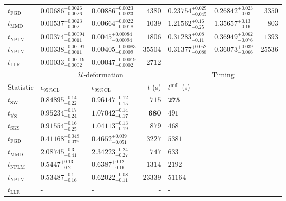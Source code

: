 \begin{tabular}{l|llr|llr}
	$t_{\mathrm{FGD}}$ & $0.00686_{-0.0026}^{+0.0026}$ & $0.00886_{-0.0023}^{+0.0023}$ & $4380$ & ${\mathbf{0.23754_{-0.045}^{+0.029}}}$ & ${\mathbf{0.26842_{-0.03}^{+0.023}}}$ & $3350$ \\
	$t_{\mathrm{MMD}}$ & ${\mathbf{0.00537_{-0.002}^{+0.0023}}}$ & ${\mathbf{0.00664_{-0.0018}^{+0.0022}}}$ & $1039$ & $1.21562_{-0.25}^{+0.16}$ & $1.35657_{-0.16}^{+0.13}$ & $803$ \\
\rowcolor{red!35}	$t_{\mathrm{NPLM}}$ & $0.00374_{-0.0011}^{+0.00094}$ & $0.0045_{-0.00094}^{+0.00084}$ & $1806$ & $0.31283_{-0.11}^{+0.08}$ & $0.36949_{-0.076}^{+0.062}$ & $1393$ \\
\rowcolor{blue!35}	$t_{\mathrm{NPLM}}$ & $0.00338_{-0.0011}^{+0.00091}$ & $0.00405_{-0.0009}^{+0.00083}$ & $35504$ & $0.31377_{-0.088}^{+0.052}$ & $0.36073_{-0.066}^{+0.039}$ & $25536$ \\
	$t_{\mathrm{LLR}}$ & $0.00033_{-0.0002}^{+0.00019}$ & $0.00047_{-0.0002}^{+0.00019}$ & $2712$ & - & - & - \\
	\toprule
	\multicolumn{1}{c}{} & \multicolumn{3}{c}{$\mathcal{U}$-deformation} & \multicolumn{3}{c}{Timing} \\
	Statistic & $\epsilon_{95\%\mathrm{CL}}$ & $\epsilon_{99\%\mathrm{CL}}$ & $t$ (s) & $t^{\mathrm{null}}$ (s) \\
	\midrule
	$t_{\mathrm{SW}}$ & $0.84895_{-0.22}^{+0.14}$ & $0.96147_{-0.15}^{+0.12}$ & $715$ & ${\mathbf{275}}$ \\
	$t_{\overline{\mathrm{KS}}}$ & $0.95234_{-0.24}^{+0.17}$ & $1.07042_{-0.17}^{+0.14}$ & ${\mathbf{680}}$ & $491$ \\
	$t_{\mathrm{SKS}}$ & $0.91554_{-0.25}^{+0.16}$ & $1.04113_{-0.19}^{+0.13}$ & $879$ & $468$ \\
	$t_{\mathrm{FGD}}$ & ${\mathbf{0.41168_{-0.076}^{+0.048}}}$ & ${\mathbf{0.4652_{-0.051}^{+0.039}}}$ & $3227$ & $5381$ \\
	$t_{\mathrm{MMD}}$ & $2.08745_{-0.41}^{+0.3}$ & $2.34223_{-0.27}^{+0.24}$ & $747$ & $633$ \\
\rowcolor{red!35}	$t_{\mathrm{NPLM}}$ & $0.5447_{-0.2}^{+0.13}$ & $0.6387_{-0.16}^{+0.12}$ & $1314$ & $2192$ \\
\rowcolor{blue!35}	$t_{\mathrm{NPLM}}$ & $0.53487_{-0.16}^{+0.1}$ & $0.62022_{-0.11}^{+0.08}$ & $23339$ & $51164$ \\
	$t_{\mathrm{LLR}}$ & - & - & - & - \\
	\bottomrule
\end{tabular}